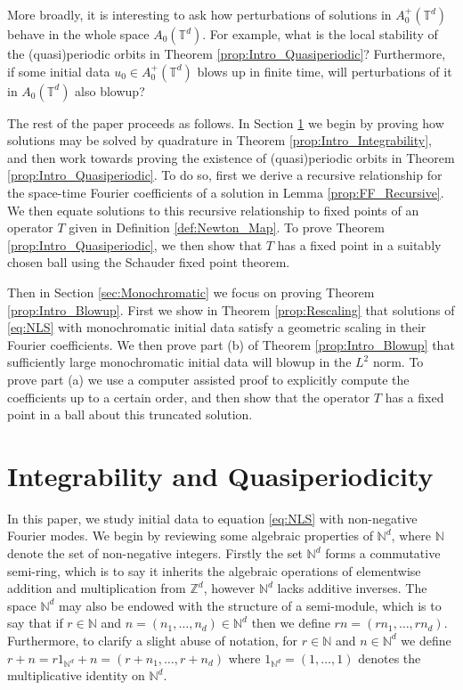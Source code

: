 \documentclass{article}
\newcommand{\N}{\mathbb{N}}
\newcommand{\Z}{\mathbb{Z}}
\newcommand{\T}{\mathbb{T}}
\begin{document}
More broadly, it is interesting to ask how perturbations of solutions in $A^+_0(\T^d)$ behave in the whole space $A_0(\T^d)$. 
For example, what is the local stability of the  (quasi)periodic orbits in Theorem \ref{prop:Intro_Quasiperiodic}? 
Furthermore, if some initial data $u_0 \in A_0^+(\T^d)$ blows up in finite time, will perturbations of it in $A_0(\T^d)$  also blowup? 






 

The rest of the paper proceeds as follows. 
In Section \ref{sec:Main} we begin by proving how solutions may be solved by quadrature in  Theorem \ref{prop:Intro_Integrability}, and then work towards proving the existence of (quasi)periodic orbits in  Theorem \ref{prop:Intro_Quasiperiodic}. 
To do so, first we derive a recursive relationship for the space-time Fourier coefficients of a solution in Lemma \ref{prop:FF_Recursive}. 
We then equate solutions to this recursive relationship to fixed points of an operator $T$ given in Definition \ref{def:Newton_Map}. 
To prove Theorem \ref{prop:Intro_Quasiperiodic}, we then show that $T$ has a fixed point in a suitably chosen ball using the Schauder fixed point theorem.   



Then in Section \ref{sec:Monochromatic} we focus on proving Theorem \ref{prop:Intro_Blowup}. 
First we show in Theorem \ref{prop:Rescaling} that solutions of \eqref{eq:NLS} with monochromatic initial data satisfy a geometric scaling in their Fourier coefficients. 
We then prove    part (b) of Theorem \ref{prop:Intro_Blowup} that sufficiently large monochromatic initial data will blowup in the $L^2$ norm. 
To  prove part (a)  we use a computer assisted proof to explicitly compute the coefficients up to a certain order, and then show that the operator $T$ has a fixed point in a ball about this truncated solution. 



\section{Integrability and Quasiperiodicity}
\label{sec:Main}



In this paper, we study initial data to equation \eqref{eq:NLS} with non-negative Fourier modes. 
We begin by reviewing some algebraic properties of $\N^d$, where  $ \N$ denote the set of non-negative integers. 
Firstly the set $ \N^d$ forms a commutative semi-ring, which is to say it inherits the algebraic operations of elementwise addition and multiplication from $ \Z^d$,  however $\N^d$ lacks additive inverses. 
The space $\N^d$ may also be endowed with the structure of a semi-module, which is to say that if $ r \in \N$ and $n = ( n_1, \dots ,n_d) \in \N^d$ then we define $ r n = ( r n_1, \dots , r n_d)$. 
Furthermore, to clarify a slight abuse of notation, for $ r \in \N$ and $n \in \N^d$ we define $ r+n = r 1_{\N^d} + n = (r+n_1 , \dots ,r+ n_d)$ where $1_{\N^d} = (1 , \dots ,1)$ denotes the multiplicative identity on $\N^d$. 
\end{document}
